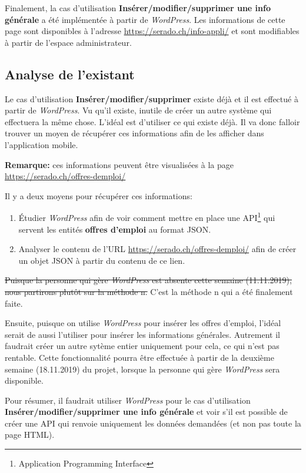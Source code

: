 \documentclass[french]{report}
\begin{document}
Finalement, la cas d'utilisation \textbf{Insérer/modifier/supprimer une info générale} 
a été implémentée à partir de \textit{WordPress}. Les informations de cette page sont
disponibles à l'adresse \url{https://serado.ch/info-appli/} et sont modifiables à
partir de l'espace administrateur.

\subsection{Analyse de l'existant}

Le cas d'utilisation \textbf{Insérer/modifier/supprimer} existe déjà et il est
effectué à partir de \textit{WordPress}. Vu qu'il existe, inutile de créer un autre
système qui effectuera la même chose. L'idéal est d'utiliser ce qui existe déjà. Il
va donc falloir trouver un moyen de récupérer ces informations afin de les afficher
dans l'application mobile.

\textbf{Remarque:} ces informations peuvent être visualisées à la page 
\url{https://serado.ch/offres-demploi/}

Il y a deux moyens pour récupérer ces informations:
\begin{enumerate}
    \item Étudier \textit{WordPress} afin de voir comment mettre en place une
    API\footnote{Application Programming Interface} qui servent les entités
    \textbf{offres d'emploi} au format JSON.
    \item Analyser le contenu de l'URL \url{https://serado.ch/offres-demploi/} afin
    de créer un objet JSON à partir du contenu de ce lien.
\end{enumerate}
\vspace{1em}

\sout{Puisque la personne qui gère \textit{WordPress} est absente cette semaine
(11.11.2019), nous partirons plutôt sur la méthode n.} C'est la méthode
n qui a été finalement faite.

Ensuite, puisque on utilise \textit{WordPress} pour insérer les offres d'emploi,
l'idéal serait de aussi l'utiliser pour insérer les informations générales.
Autrement il faudrait créer un autre sytème entier uniquement pour cela, ce qui n'est
pas rentable. Cette fonctionnalité pourra être effectuée à partir de la deuxième semaine
(18.11.2019) du projet, lorsque la personne qui gère \textit{WordPress} sera disponible.


Pour résumer, il faudrait utiliser \textit{WordPress} pour le cas d'utilisation
\textbf{Insérer/modifier/supprimer une info générale} et voir s'il est possible de
créer une API qui renvoie uniquement les données demandées (et non pas toute la
page HTML).
\end{document}
